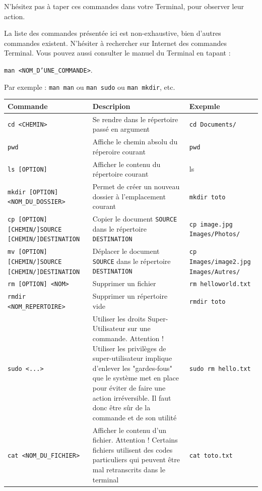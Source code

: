 \documentclass[12pt]{book}
\begin{document}
	N'hésitez pas à taper ces commandes dans votre Terminal, pour observer leur action.\par
	La liste des commandes présentée ici est non-exhaustive, bien d'autres commandes existent.
	N'hésiter à rechercher sur Internet des commandes Terminal.
	Vous pouvez aussi consulter le manuel du Terminal en tapant :
	\begin{center}
		\texttt{man <NOM\_D'UNE\_COMMANDE>}.
	\end{center}
	Par exemple : \texttt{man man} ou \texttt{man sudo} ou \texttt{man mkdir}, etc.
	\begin{longtable}{|p{}|p{}|p{}|}\hline
		\rowcolor{lightgray}Commande & Descripion & Exepmle\\\hline
		\endhead
		\texttt{cd <CHEMIN>} & Se rendre dans le répertoire passé en argument & \texttt{cd Documents/}\\\hline
		\texttt{pwd} & Affiche le chemin absolu du réperoire courant & \texttt{pwd}\\\hline
		\texttt{ls [OPTION]} & Afficher le contenu du répertoire courant & ls\\\hline
		\texttt{mkdir [OPTION] <NOM\_DU\_DOSSIER>} & Permet de créer un nouveau dossier à l'emplacement courant & \texttt{mkdir toto}\\\hline
		\texttt{cp [OPTION] [CHEMIN/]SOURCE [CHEMIN/]DESTINATION} & Copier le document \texttt{SOURCE} dans le répertoire \texttt{DESTINATION} & \texttt{cp image.jpg Images/Photos/}\\\hline
		\texttt{mv [OPTION] [CHEMIN/]SOURCE [CHEMIN/]DESTINATION} & Déplacer le document \texttt{SOURCE} dans le répertoire \texttt{DESTINATION} & \texttt{cp Images/image2.jpg Images/Autres/}\\\hline
		\texttt{rm [OPTION] <NOM>} & Supprimer un fichier & \texttt{rm helloworld.txt}\\\hline
		\texttt{rmdir <NOM\_REPERTOIRE>} & Supprimer un répertoire vide & \texttt{rmdir toto}\\\hline
		\texttt{sudo <...>} & Utiliser les droits Super-Utilisateur sur une commande. Attention ! Utiliser les privilèges de super-utilisateur implique d'enlever les "gardes-fous" que le système met en place pour éviter de faire une action irréversible. Il faut donc être sûr de la commande et de son utilité & \texttt{sudo rm hello.txt}\\\hline
		\texttt{cat <NOM\_DU\_FICHIER>} & Afficher le contenu d'un fichier. Attention ! Certains fichiers utilisent des codes particuliers qui peuvent être mal retranscrits dans le terminal & \texttt{cat toto.txt}\\\hline

\end{longtable}
\end{document}
